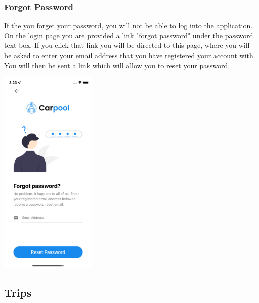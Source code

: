 \documentclass[hidelinks, 12pt, a4paper]{article}
\begin{document}
\subsubsection{Forgot Password}
If the you forget your password, you will not be able to log into the application. On the login page you are provided a link "forgot password" under the password text box. If you click that link you will be directed to this page, where you will be asked to enter your email address that you have registered your account with. You will then be sent a link which will allow you to reset your password.
\begin{center}
  \includegraphics[height=10cm]{images/Simulator Screen Shot - iPhone X - 2022-06-10 at 03.23.17.png}
\end{center}
\vspace{1cm}

\subsection{Trips}
\end{document}
